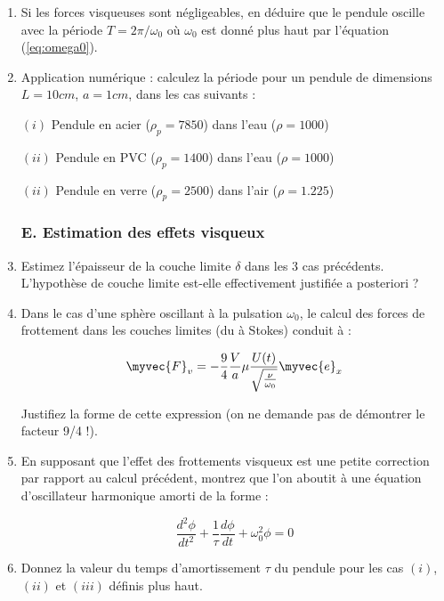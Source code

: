 \begin{enumerate}
\item Si les forces visqueuses sont négligeables, en déduire que le pendule oscille avec la période $T = 2\pi / \omega_0$ où $\omega_0$ est donné plus haut par l'équation (\ref{eq:omega0}).

\item 
Application numérique : calculez la période pour un pendule de dimensions $L=10cm$, $a=1cm$, dans les cas suivants :

$(i)$ Pendule en acier ($\rho_p = 7850$) dans l'eau ($\rho = 1000$)

$(ii)$ Pendule en PVC ($\rho_p = 1400$) dans l'eau ($\rho = 1000$)

$(ii)$ Pendule en verre ($\rho_p = 2500$) dans l'air ($\rho = 1.225$)

\subsubsection*{E. Estimation des effets visqueux}

\item Estimez l'épaisseur de la couche limite $\delta$ dans les 3 cas précédents. L'hypothèse de couche limite est-elle effectivement justifiée a posteriori ?

\item Dans le cas d'une sphère oscillant à la pulsation $\omega_0$, le calcul des forces de frottement dans les couches limites (du à Stokes) conduit à :

$$
\myvec{F}_v = - \frac{9}{4} \frac{V}{a}  \mu \frac{U(t)}{\sqrt{\frac{\nu}{\omega_0}}} \myvec{e}_x
$$   

Justifiez la forme de cette expression (on ne demande pas de démontrer le facteur 9/4 !).

\item
En supposant que l'effet des frottements visqueux est une petite correction par rapport au calcul précédent, montrez que l'on aboutit à une équation d'oscillateur harmonique amorti de la forme :

$$
\frac{d^2 \phi}{d t^2} + \frac{1}{\tau} \frac{d \phi}{d t} + \omega_0^2 \phi =0
$$

\item Donnez la valeur du temps d'amortissement $\tau$ du pendule pour les cas $(i)$, $(ii)$ et $(iii)$ définis plus haut.

\end{enumerate}


